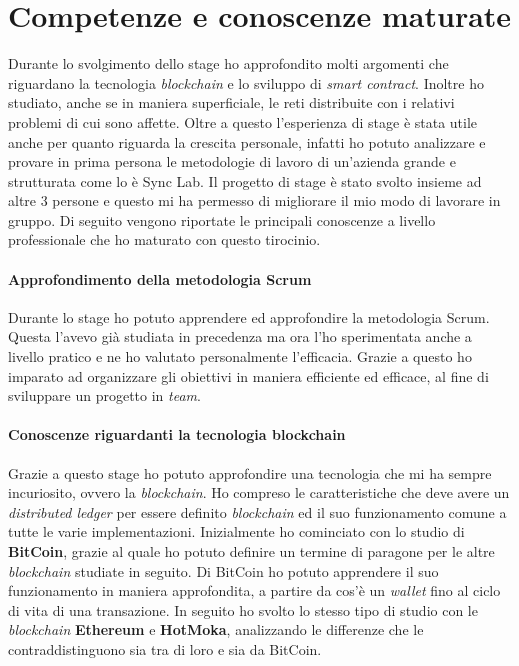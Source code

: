 
\section{Competenze e conoscenze maturate}
Durante lo svolgimento dello stage ho approfondito molti argomenti che riguardano la tecnologia \textit{blockchain} e lo sviluppo di \textit{smart contract}. Inoltre ho studiato, anche se in maniera superficiale, le reti distribuite con i relativi problemi di cui sono affette.
Oltre a questo l'esperienza di stage è stata utile anche per quanto riguarda la crescita personale, infatti ho potuto analizzare e provare in prima persona le metodologie di lavoro di un'azienda grande e strutturata come lo è Sync Lab. Il progetto di stage è stato svolto insieme ad altre 3 persone e questo mi ha permesso di migliorare il mio modo di lavorare in gruppo. 
Di seguito vengono riportate le principali conoscenze a livello professionale che ho maturato con questo tirocinio. 

\paragraph{Approfondimento della metodologia Scrum}
Durante lo stage ho potuto apprendere ed approfondire la metodologia Scrum. Questa l'avevo già studiata in precedenza ma ora l'ho sperimentata anche a livello pratico e ne ho valutato personalmente l'efficacia. Grazie a questo ho imparato ad organizzare gli obiettivi in maniera efficiente ed efficace, al fine di sviluppare un progetto in \textit{team}.

\paragraph{Conoscenze riguardanti la tecnologia blockchain} 
Grazie a questo stage ho potuto approfondire una tecnologia che mi ha sempre incuriosito, ovvero la \textit{blockchain}. Ho compreso le caratteristiche che deve avere un \textit{distributed ledger} per essere definito \textit{blockchain} ed il suo funzionamento comune a tutte le varie implementazioni. 
Inizialmente ho cominciato con lo studio di \textbf{BitCoin}, grazie al quale ho potuto definire un termine di paragone per le altre \textit{blockchain} studiate in seguito. Di BitCoin ho potuto apprendere il suo funzionamento in maniera approfondita, a partire da cos'è un \textit{wallet} fino al ciclo di vita di una transazione. In seguito ho svolto lo stesso tipo di studio con le \textit{blockchain} \textbf{Ethereum} e \textbf{HotMoka}, analizzando le differenze che le contraddistinguono sia tra di loro e sia da BitCoin. \\

